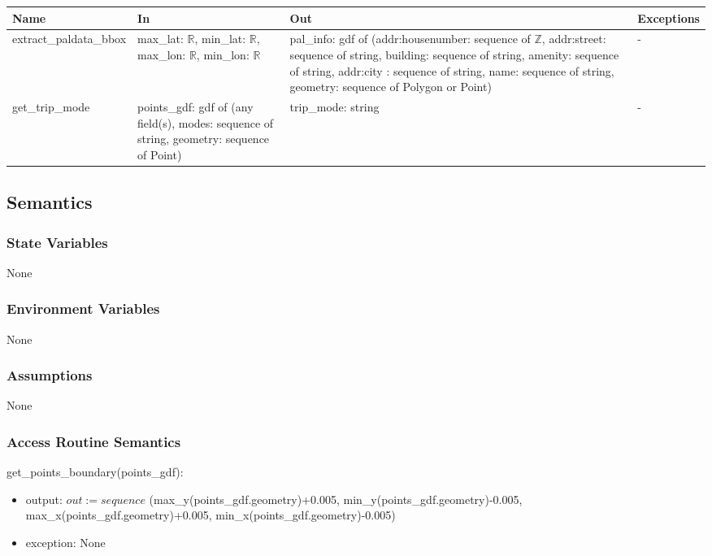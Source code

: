 \documentclass[12pt, titlepage]{article}
\begin{document}
\begin{center}
\begin{tabular}{| >{\raggedright}p{5cm} | >{\raggedright}p{4cm} | >{\raggedright}p{4cm} | l |}
\hline
\textbf{Name} & \textbf{In} & \textbf{Out} & \textbf{Exceptions} \\
\hline
extract\_paldata\_bbox & max\_lat: $\mathbb{R}$, \newline min\_lat: $\mathbb{R}$, \newline max\_lon: $\mathbb{R}$, \newline min\_lon: $\mathbb{R}$ & pal\_info: gdf of (addr:housenumber: sequence of $\mathbb{Z}$, \newline addr:street: sequence of string, \newline building: sequence of string, \newline amenity: sequence of string, \newline addr:city : sequence of string, \newline name: sequence of string, \newline geometry: sequence of Polygon or Point) & -\\
\hline
get\_trip\_mode & points\_gdf: gdf of (any field(s), \newline modes: sequence of string, \newline geometry: sequence of Point) & trip\_mode: string & -\\
\hline

\end{tabular}
\end{center}
\subsection{Semantics}

\subsubsection{State Variables}
None

\subsubsection{Environment Variables} None

\subsubsection{Assumptions} None

\subsubsection{Access Routine Semantics}
get\_points\_boundary(points\_gdf):
\begin{itemize}
\item output: 
$ out := sequence$ (max\_y(points\_gdf.geometry)+0.005, min\_y(points\_gdf.geometry)-0.005, max\_x(points\_gdf.geometry)+0.005, min\_x(points\_gdf.geometry)-0.005)
\item exception: None
\end{itemize}
\end{document}
